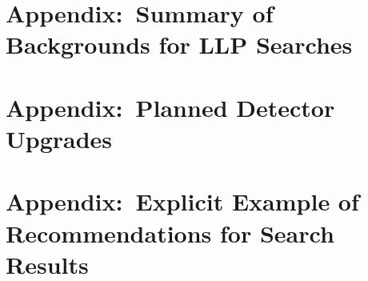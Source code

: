 \documentclass[a4paper,debug,notitlepage,nobib]{tufte-book}
\begin{document}


\appendix




\chapter{Appendix:~Summary of Backgrounds for LLP Searches}
\label{sec:backgrounds}


\chapter{Appendix:~Planned Detector Upgrades}
\label{app:Upgrade_Appendix}


\chapter{Appendix:~Explicit Example of Recommendations for Search Results}
\label{app:ExampleRec_Appendix}


%
% 
%
%
%
%
%
\printbibliography
\end{document}
